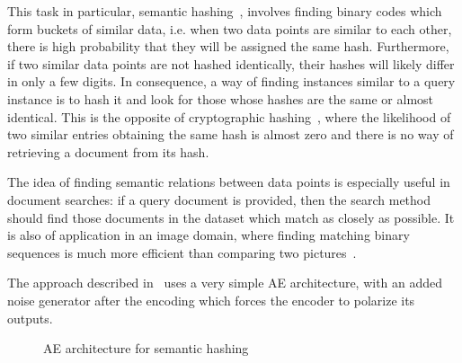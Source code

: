 This task in particular, semantic hashing~, involves finding binary codes which form buckets of similar data, i.e. when two data points are similar to each other, there is high probability that they will be assigned the same hash. Furthermore, if two similar data points are not hashed identically, their hashes will likely differ in only a few digits. In consequence, a way of finding instances similar to a query instance is to hash it and look for those whose hashes are the same or almost identical. This is the opposite of cryptographic hashing~, where the likelihood of two similar entries obtaining the same hash is almost zero and there is no way of retrieving a document from its hash.

The idea of finding semantic relations between data points is especially useful in document searches: if a query document is provided, then the search method should find those documents in the dataset which match as closely as possible. It is also of application in an image domain, where finding matching binary sequences is much more efficient than comparing two pictures~.

The approach described in~ uses a very simple AE architecture, with an added noise generator after the encoding which forces the encoder to polarize its outputs. 



\begin{figure}[ht]
    \centering\small
    \caption{AE architecture for semantic hashing}
    \label{fig:semantic}
\end{figure}


